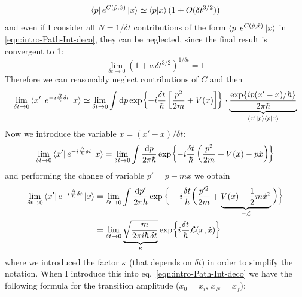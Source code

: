 \documentclass[../main/main.tex]{subfiles}
\begin{document}
\[\bra{p}e^{C(\hat p,\hat x)}\ket{x}\simeq\braket{p}{x}(1+O(\delta t^{3/2}))\]
and even if I consider all $N=1/\delta t$ contributions of the form $\bra{p}e^{C(\hat p,\hat x)}\ket{x}$ in \eqref{eqn:intro-Path-Int-deco}, they can be neglected, since the final result is convergent to 1: 
\[\lim_{\delta t\to0}(1+a\,\delta t^{3/2})^{1/\delta t}=1\]
Therefore we can reasonably neglect contributions of $C$ and then
\[\lim_{\delta t\to0}\bra{x'}e^{-i\frac{\hat H}{\hbar}\delta t}\ket{x}
\simeq\lim_{\delta t\to0}\int\textup{d} p\exp{-i\frac{\delta t}{\hbar}\left[\frac{p^2}{2m}+V(x)\right]}\cdot\underbrace{\frac{\exp{i p(x'-x)/\hbar}}{2\pi\hbar}}_{\braket*{x'}{p}\braket{p}{x}}\]
Now we introduce the variable $\dot x=(x'-x)/\delta t$: 
\[\lim_{\delta t\to0}\bra{x'}e^{-i\frac{\hat H}{\hbar}\delta t}\ket{x}
=\lim_{\delta t\to0}\int\frac{\textup{d} p}{2\pi\hbar}\exp{-i\frac{\delta t}{\hbar}\left(\frac{p^2}{2m}+V(x)-p\dot x\right)}\]
and performing the change of variable $p'=p-m\dot x$ we obtain
\begin{align*}
\lim_{\delta t\to0}\bra{x'}e^{-i\frac{\hat H}{\hbar}\delta t}\ket{x}
&=\lim_{\delta t\to0}\int\frac{\textup{d} p'}{2\pi\hbar}\exp\bigg\{-i\frac{\delta t}{\hbar}\bigg(\frac{p'^2}{2m}+\underbrace{V(x)-\frac12m\dot x^2}_{-\mathcal L}\bigg)\bigg\}\\
&=\lim_{\delta t\to0}\underbrace{\sqrt{\frac{m}{2\pi i\hbar\,\delta t}}}_{\kappa}\exp{i\frac{\delta t}{\hbar}\mathcal L(x,\dot x)}
\end{align*}
where we introduced the factor $\kappa$ (that depends on $\delta t$) in order to simplify the notation. When I introduce this into eq.~\eqref{eqn:intro-Path-Int-deco} we have the following formula for the transition amplitude ($x_0=x_i$, $x_N=x_f$):
\end{document}
